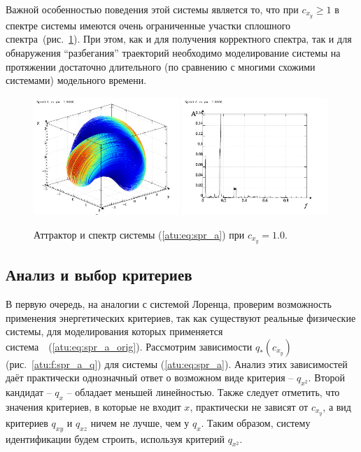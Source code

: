 Важной особенностью поведения этой системы является то, что при $ c_{x_y} \ge 1 $
в спектре системы имеются очень ограниченные участки сплошного спектра~(рис.~\ref{atu:f:spr_a_p_1000}).
При этом, как и для получения корректного спектра, так и для обнаружения ``разбегания'' траекторий
необходимо моделирование системы на протяжении достаточно длительного
(по сравнению с многими схожими системами) модельного времени.

\begin{figure}[htb!]
\centerline{
  \includegraphics[width=0.49\textwidth]{p/cha/spr_a/sprott_a-p_xyz_cx_y=1x000.png}
  \includegraphics[width=0.49\textwidth]{p/cha/spr_a/sprott_a_f-p_f_cx_y=1x000.png}
}
\caption{Аттрактор и спектр системы (\ref{atu:eq:spr_a}) при $ c_{x_y} =1.0 $.
}
\label{atu:f:spr_a_p_1000}
\end{figure}



\subsection{Анализ и выбор критериев}  %

В первую очередь, на аналогии с системой Лоренца,
проверим возможность применения энергетических критериев,
так как существуют реальные физические системы,
для моделирования которых применяется система~~(\ref{atu:eq:spr_a_orig}).
Рассмотрим зависимости $q_{*}(c_{x_y}) $ (рис.~\ref{atu:f:spr_a_q})
для системы (\ref{atu:eq:spr_a}). Анализ этих зависимостей
даёт практически однозначный ответ о возможном виде критерия -- $q_{x^2}$.
Второй кандидат -- $q_{x}$ -- обладает меньшей линейностью.
Также следует отметить, что
значения критериев, в которые не входит $x$, практически не зависят от $c_{x_y}$,
а вид критериев $q_{xy}$ и $q_{xz}$ ничем не лучше, чем у $q_{x}$.
Таким образом, систему идентификации будем строить, используя критерий  $q_{x^2}$.

